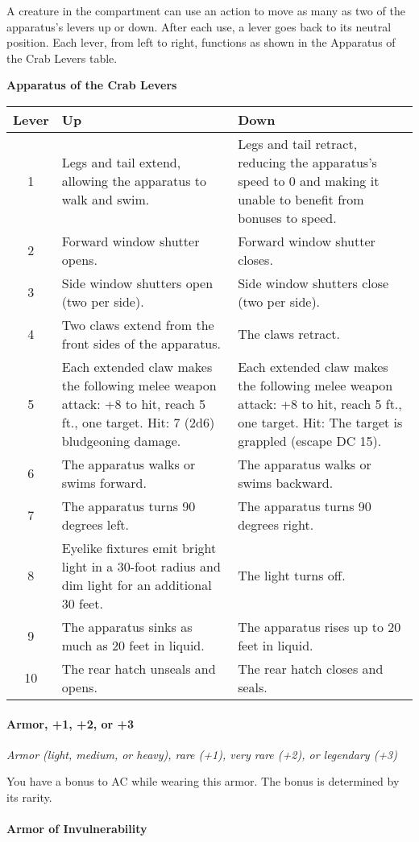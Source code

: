 \documentclass[
]{article}
\begin{document}
A creature in the compartment can use an action to move as many as two
of the apparatus's levers up or down. After each use, a lever goes back
to its neutral position. Each lever, from left to right, functions as
shown in the Apparatus of the Crab Levers table.

\textbf{Apparatus of the Crab Levers}

\begin{longtable}[]{@{}cll@{}}
\toprule
Lever & Up & Down\tabularnewline
\midrule
\endhead
1 & Legs and tail extend, allowing the apparatus to walk and swim. &
Legs and tail retract, reducing the apparatus's speed to 0 and making it
unable to benefit from bonuses to speed.\tabularnewline
2 & Forward window shutter opens. & Forward window shutter
closes.\tabularnewline
3 & Side window shutters open (two per side). & Side window shutters
close (two per side).\tabularnewline
4 & Two claws extend from the front sides of the apparatus. & The claws
retract.\tabularnewline
5 & Each extended claw makes the following melee weapon attack: +8 to
hit, reach 5 ft., one target. Hit: 7 (2d6) bludgeoning damage. & Each
extended claw makes the following melee weapon attack: +8 to hit, reach
5 ft., one target. Hit: The target is grappled (escape DC
15).\tabularnewline
6 & The apparatus walks or swims forward. & The apparatus walks or swims
backward.\tabularnewline
7 & The apparatus turns 90 degrees left. & The apparatus turns 90
degrees right.\tabularnewline
8 & Eyelike fixtures emit bright light in a 30-foot radius and dim light
for an additional 30 feet. & The light turns off.\tabularnewline
9 & The apparatus sinks as much as 20 feet in liquid. & The apparatus
rises up to 20 feet in liquid.\tabularnewline
10 & The rear hatch unseals and opens. & The rear hatch closes and
seals.\tabularnewline
\bottomrule
\end{longtable}

\hypertarget{armor-1-2-or-3}{%
\paragraph{Armor, +1, +2, or +3}\label{armor-1-2-or-3}}

\emph{Armor (light, medium, or heavy), rare (+1), very rare (+2), or
legendary (+3)}

You have a bonus to AC while wearing this armor. The bonus is determined
by its rarity.

\hypertarget{armor-of-invulnerability}{%
\paragraph{Armor of Invulnerability}\label{armor-of-invulnerability}}
\end{document}
